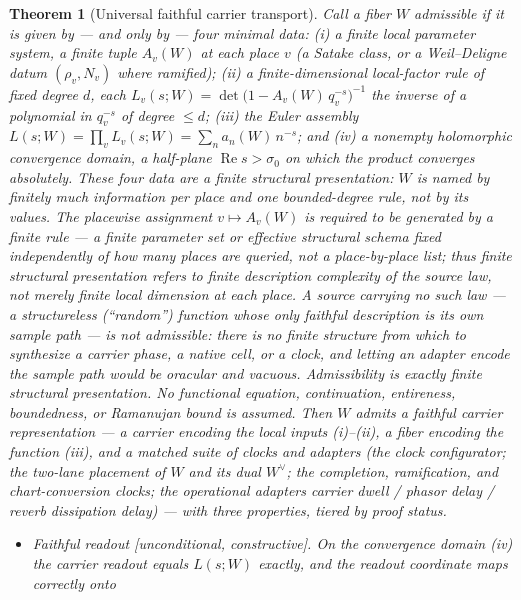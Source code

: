 \documentclass[11pt]{article}
\newtheorem{theorem}{Theorem}
\theoremstyle{definition}
\renewcommand{\Re}{\operatorname{Re}}
\begin{document}
\begin{theorem}[Universal faithful carrier transport]\label{thm:universal}
Call a fiber $W$ \emph{admissible} if it is given by --- and only by --- four minimal data: \emph{(i)} a
\emph{finite local parameter system}, a finite tuple $A_v(W)$ at each place $v$ (a Satake class, or a
Weil--Deligne datum $(\rho_v,N_v)$ where ramified); \emph{(ii)} a \emph{finite-dimensional local-factor rule} of
fixed degree $d$, each $L_v(s;W)=\det\!\big(1-A_v(W)\,q_v^{-s}\big)^{-1}$ the inverse of a polynomial in
$q_v^{-s}$ of degree $\le d$; \emph{(iii)} the \emph{Euler assembly}
$L(s;W)=\prod_v L_v(s;W)=\sum_n a_n(W)\,n^{-s}$; and \emph{(iv)} a \emph{nonempty holomorphic convergence domain},
a half-plane $\Re s>\sigma_0$ on which the product converges absolutely. These four data are a \emph{finite structural presentation}: $W$ is named by finitely much information per place and one bounded-degree rule, not by its values. The placewise assignment $v\mapsto A_v(W)$ is required to be generated by a \emph{finite rule} --- a finite parameter set or effective structural schema fixed independently of how many places are queried, not a place-by-place list; thus finite structural presentation refers to finite description complexity of the source law, not merely finite local dimension at each place. A source carrying \emph{no} such law --- a structureless (``random'') function whose only faithful description is its own sample path --- is \emph{not} admissible: there is no finite structure from which to synthesize a carrier phase, a native cell, or a clock, and letting an adapter encode the sample path would be oracular and vacuous. Admissibility is \emph{exactly} finite structural presentation. \emph{No functional equation,
continuation, entireness, boundedness, or Ramanujan bound is assumed.} Then $W$ admits a \emph{faithful carrier
representation} --- a carrier encoding the local inputs \emph{(i)--(ii)}, a fiber encoding the function
\emph{(iii)}, and a matched suite of clocks and adapters (the clock configurator; the two-lane placement of $W$
and its dual $W^\vee$; the completion, ramification, and chart-conversion clocks; the operational adapters
carrier dwell / phasor delay / reverb dissipation delay) --- with three properties, tiered by proof status.
\begin{itemize}
\item[\textup{(a)}] \emph{Faithful readout} \textup{[unconditional, constructive]}. On the convergence domain
\emph{(iv)} the carrier readout equals $L(s;W)$ exactly, and the readout coordinate maps correctly onto

\end{itemize}
\end{theorem}
\end{document}
